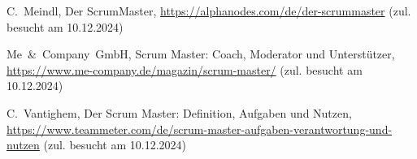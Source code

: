 \documentclass[5pt, final]{beamer}
\begin{document}
\begin{frame}[t]
\begin{multicols}{3}
\begin{thebibliography}{99}
				 C.~Meindl, Der ScrumMaster, \url{https://alphanodes.com/de/der-scrummaster} (zul. besucht am 10.12.2024)
				
				 Me~\&~Company~GmbH, Scrum Master: Coach, Moderator und Unterstützer, \url{https://www.me-company.de/magazin/scrum-master/} (zul. besucht am 10.12.2024)
				
				 C.~Vantighem, Der Scrum Master: Definition, Aufgaben und Nutzen, \url{https://www.teammeter.com/de/scrum-master-aufgaben-verantwortung-und-nutzen} (zul. besucht am 10.12.2024)
				
			\end{thebibliography}
			
		\end{multicols}
		
	\end{frame}
\end{document}
